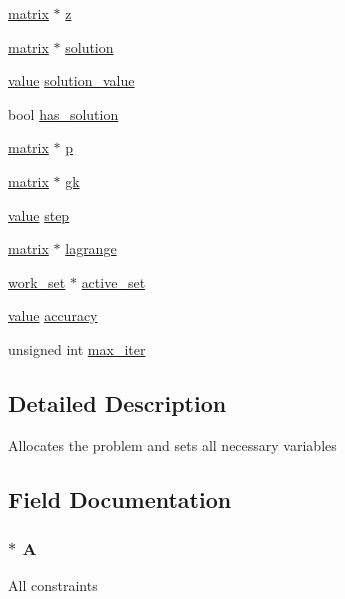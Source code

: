 \begin{DoxyCompactItemize}
\item 
\hyperlink{structmatrix}{matrix} $\ast$ \hyperlink{structproblem_a840058b5c67561185c94da497d0d3da6}{z}
\item 
\hyperlink{structmatrix}{matrix} $\ast$ \hyperlink{structproblem_a70626c7db657c601438f867391005721}{solution}
\item 
\hyperlink{mat_lib_8h_a24f54d55d636a8405ad2cf062c3c9bee}{value} \hyperlink{structproblem_a6fcb6ec86b1ba65bd2a34e9a9731c452}{solution\+\_\+value}
\item 
bool \hyperlink{structproblem_af593a3f5fcf12e8513374bc6475a53d4}{has\+\_\+solution}
\item 
\hyperlink{structmatrix}{matrix} $\ast$ \hyperlink{structproblem_a0b8e7c785036ef0cb64a801257094918}{p}
\item 
\hyperlink{structmatrix}{matrix} $\ast$ \hyperlink{structproblem_abfbecabeb3ffaa60557898d366c79c35}{gk}
\item 
\hyperlink{mat_lib_8h_a24f54d55d636a8405ad2cf062c3c9bee}{value} \hyperlink{structproblem_a9c398bc1d126ef3a4cf1efdc9d9f7423}{step}
\item 
\hyperlink{structmatrix}{matrix} $\ast$ \hyperlink{structproblem_a988084bf1423637718de8882244149f4}{lagrange}
\item 
\hyperlink{structwork__set}{work\+\_\+set} $\ast$ \hyperlink{structproblem_a27b8b36dc36cb3620e52c6275d0bb87b}{active\+\_\+set}
\item 
\hyperlink{mat_lib_8h_a24f54d55d636a8405ad2cf062c3c9bee}{value} \hyperlink{structproblem_abb02aa4aa436e037d8c806b2364cf97c}{accuracy}
\item 
unsigned int \hyperlink{structproblem_a58e3dae44c3756ebff55dd1a3907d7e4}{max\+\_\+iter}
\end{DoxyCompactItemize}


\subsection{Detailed Description}
Allocates the problem and sets all necessary variables 

\subsection{Field Documentation}
\hypertarget{structproblem_ac56453eb618f2ce98f20d91442a5690b}{}
\subsubsection[{A}]{$\ast$ A}\label{structproblem_ac56453eb618f2ce98f20d91442a5690b}
All constraints \hypertarget{structproblem_abb02aa4aa436e037d8c806b2364cf97c}{}
